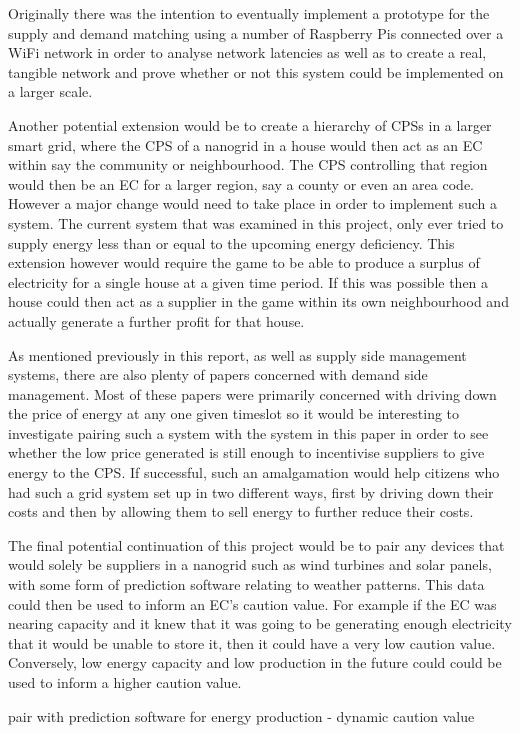 \documentclass[a4paper, notitlepage]{report}
\begin{document}
Originally there was the intention to eventually implement a prototype for the
supply and demand matching using a number of Raspberry Pis connected over a WiFi
network in order to analyse network latencies as well as to create a real,
tangible network and prove whether or not this system could be implemented on a
larger scale.

Another potential extension would be to create a hierarchy of CPSs in a larger
smart grid, where the CPS of a nanogrid in a house would then act as an EC
within say the community or neighbourhood. The CPS controlling that region would
then be an EC for a larger region, say a county or even an area code. However a
major change would need to take place in order to implement such a system. The
current system that was examined in this project, only ever tried to supply
energy less than or equal to the upcoming energy deficiency. This extension
however would require the game to be able to produce a surplus of electricity
for a single house at a given time period. If this was possible then a house
could then act as a supplier in the game within its own neighbourhood and
actually generate a further profit for that house. 

As mentioned previously in this report, as well as supply side management
systems, there are also plenty of papers concerned with demand side management.
Most of these papers were primarily concerned with driving down the price of
energy at any one given timeslot so it would be interesting to investigate
pairing such a system with the system in this paper in order to see whether the
low price generated is still enough to incentivise suppliers to give energy to
the CPS. If successful, such an amalgamation would help citizens who had such a
grid system set up in two different ways, first by driving down their costs and
then by allowing them to sell energy to further reduce their costs.

The final potential continuation of this project would be to pair any devices
that would solely be suppliers in a nanogrid such as wind turbines and solar
panels, with some form of prediction software relating to weather patterns. This
data could then be used to inform an EC's caution value. For example if the EC
was nearing capacity and it knew that it was going to be generating enough
electricity that it would be unable to store it, then it could have a very low
caution value. Conversely, low energy capacity and low production in the future
could could be used to inform a higher caution value.

pair with prediction software for energy production - dynamic caution value 

\printbibliography
\appendix
\end{document}
